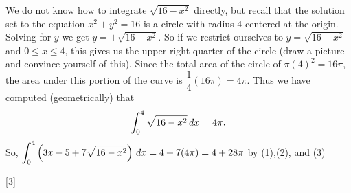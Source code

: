 \documentclass{ximera}
\begin{document}
\begin{problem}
\begin{enumerate}
\begin{explanation}
      We do not know how to integrate $\sqrt{16-x^2}$ directly, but recall that the solution set to the equation $x^2 + y^2 = 16$ is a circle with radius $4$ centered at the origin.  
      Solving for $y$ we get $y = \pm \sqrt{16-x^2}$.  
      So if we restrict ourselves to $y=\sqrt{16-x^2}$ and $0 \leq x \leq 4$, this gives us the upper-right quarter of the circle (draw a picture and convince yourself of this).  
      Since the total area of the circle of $\pi (4)^2 = 16\pi$, the area under this portion of the curve is $\dfrac{1}{4} (16\pi) = 4\pi$.  
      Thus we have computed (geometrically) that 
      \begin{equation}\label{eq3}
        \displaystyle \int_0^4 \sqrt{16-x^2} \,d x = 4\pi. 
      \end{equation}
      So, $\displaystyle \int _0^4 \left( 3x - 5 + 7 \sqrt{16-x^2} \right) \,d x = 4 + 7(4\pi) = 4 + 28\pi$ by (1),(2), and (3)
      \end{explanation}
	[3]

  \end{enumerate}
\end{problem}
\end{document}

